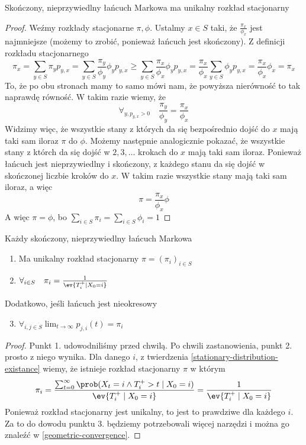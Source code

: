 \begin{theorem}
	Skończony, nieprzywiedlny łańcuch Markowa ma unikalny rozkład stacjonarny
\end{theorem}
\begin{proof}
	Weźmy rozkłady stacjonarne \(\pi, \phi\). Ustalmy \(x \in S\) taki, że \(\frac{\pi_x}{\phi_x}\) jest najmniejsze (możemy to zrobić, ponieważ łańcuch jest skończony). Z definicji rozkładu stacjonarnego
	\[
		\pi_x = \sum_{y \in S} \pi_y p_{y, x} = \sum_{y \in S} \frac{\pi_y}{\phi_y} \phi_y p_{y, x} \geq \sum_{y \in S} \frac{\pi_x}{\phi_x} \phi_y p_{y, x} = \frac{\pi_x}{\phi_x} \sum_{y \in S} \phi_y p_{y, x} = \frac{\pi_x}{\phi_x} \phi_x = \pi_x
	\]
	To, że po obu stronach mamy to samo mówi nam, że powyższa nierówność to tak naprawdę równość. W takim razie wiemy, że
	\[
		\forall_{y, p_{y, x} > 0} \quad \frac{\pi_y}{\phi_y} = \frac{\pi_x}{\phi_x}
	\]
	Widzimy więc, że wszystkie stany z których da się bezpośrednio dojść do \(x\) mają taki sam iloraz \(\pi\) do \(\phi\). Możemy następnie analogicznie pokazać, że wszystkie stany z którch da się dojść w \(2, 3, \dots\) krokach do \(x\) mają taki sam iloraz. Ponieważ łańcuch jest nieprzywiedlny i skończony, z każdego stanu da się dojść w skończonej liczbie kroków do \(x\). W takim razie wszystkie stany mają taki sam iloraz, a więc
	\[
		\pi = \frac{\pi_x}{\phi_x} \phi
	\]
	A więc \(\pi = \phi\), bo \(\sum_{i \in S} \pi_i = \sum_{i \in S} \phi_i = 1\)
\end{proof}
\begin{theorem}
	Każdy skończony, nieprzywiedlny łańcuch Markowa
	\begin{enumerate}
		\item Ma unikalny rozkład stacjonarny \(\pi = (\pi_i)_{i \in S}\)
		\item \(\forall_{i \in S} \quad \pi_i = \frac{1}{\ev{T_i^+ \mid X_0 = i}}\)
	\end{enumerate}
	Dodatkowo, jeśli łańcuch jest nieokresowy
	\begin{enumerate}
		\setcounter{enumi}{2}
		\item \(\forall_{i, j \in S} \lim_{t \to \infty} p_{j, i}(t) = \pi_i\)
	\end{enumerate}
\end{theorem}
\begin{proof}
	Punkt 1. udowodniliśmy przed chwilą. Po chwili zastanowienia, punkt 2. prosto z niego wynika. Dla danego \(i\), z twierdzenia \ref{stationary-distribution-existance} wiemy, że istnieje rozkład stacjonarny \(\pi\) w którym
	\[
		\pi_i = \frac{\sum_{t=0}^{\infty} \prob(X_t = i \land T_i^+ > t \mid X_0 = i)}{\ev{T_i^+ \mid X_0 = i}} = \frac{1}{\ev{T_i^+ \mid X_0 = i}}
	\]
	Ponieważ rozkład stacjonarny jest unikalny, to jest to prawdziwe dla każdego \(i\).\\
	Za to do dowodu punktu 3. będziemy potrzebowali więcej narzędzi i można go znaleźć w \ref{geometric-convergence}.
\end{proof}

